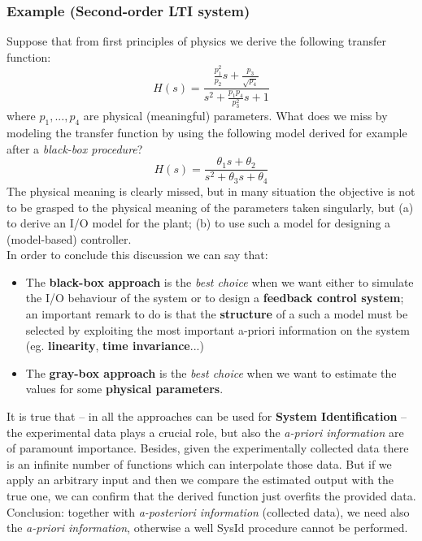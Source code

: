 \subsubsection{Example (Second-order LTI system)}
Suppose that from first principles of physics we derive the following transfer function:
\begin{equation*}\label{eq:nonlinear}
    H(s)=\frac{
        \frac{p_1^2}{p_2}s+\frac{p_3}{\sqrt{p_4}}
    }{
        s^2+\frac{p_1p_4}{p_3^2}s+1
    }
\end{equation*}
where $p_1, ..., p_4$ are physical (meaningful) parameters. What does we miss by modeling the transfer function by using the following model derived for example after a \textit{black-box procedure}?
\begin{equation*}
    H(s)=\frac{\theta_1{s}+\theta_2}{s^2+\theta_3{s}+\theta_4}
\end{equation*}
The physical meaning is clearly missed, but in many situation the objective is not to be grasped to the physical meaning of the parameters taken singularly, but (a) to derive an I/O model for the plant; (b) to use such a model for designing a (model-based) controller.\\

\noindent
In order to conclude this discussion we can say that:
\begin{itemize}
    \item The \textbf{black-box approach} is the \textit{best choice} when we want either to simulate the I/O behaviour of the system or to design a \textbf{feedback control system}; an important remark to do is that the \textbf{structure} of a such a model must be selected by exploiting the most important a-priori information on the system (eg. \textbf{linearity}, \textbf{time invariance}...)
    \item The \textbf{gray-box approach} is the \textit{best choice} when we want to estimate the values for some \textbf{physical parameters}.
\end{itemize}
\noindent 
It is true that -- in all the approaches can be used for \textbf{System Identification} -- the experimental data plays a crucial role, but also the \textit{a-priori information} are of paramount importance. Besides, given the experimentally collected data there is an infinite number of functions which can interpolate those data. But if we apply an arbitrary input and then we compare the estimated output with the true one, we can confirm that the derived function just overfits the provided data. Conclusion: together with \textit{a-posteriori information} (collected data), we need also the \textit{a-priori information}, otherwise a well SysId procedure cannot be performed.


